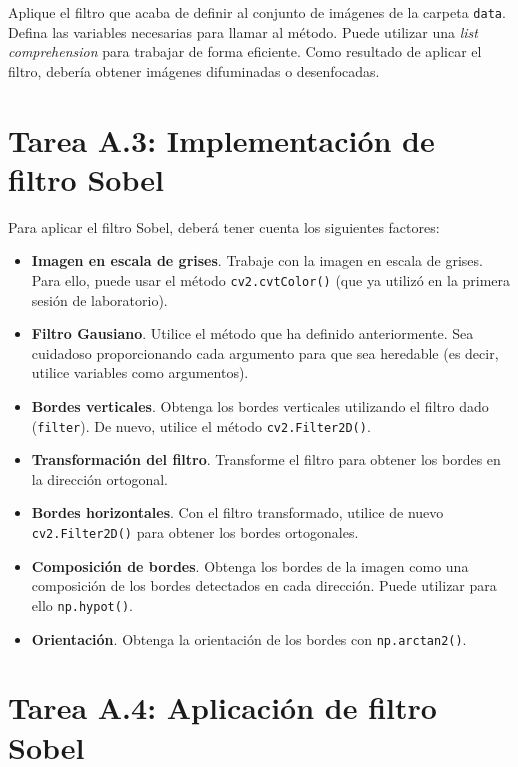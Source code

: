 Aplique el filtro que acaba de definir al conjunto de imágenes de la carpeta \texttt{data}. Defina las variables necesarias para llamar al método. Puede utilizar una \textit{list comprehension} para trabajar de forma eficiente. Como resultado de aplicar el filtro, debería obtener imágenes difuminadas o desenfocadas.

\section*{Tarea A.3: Implementación de filtro Sobel}
{}

Para aplicar el filtro Sobel, deberá tener cuenta los siguientes factores:

\begin{itemize}
    \item \textbf{Imagen en escala de grises}. Trabaje con la imagen en escala de grises. Para ello, puede usar el método \texttt{cv2.cvtColor()} (que ya utilizó en la primera sesión de laboratorio).
    
    \item \textbf{Filtro Gausiano}. Utilice el método que ha definido anteriormente. Sea cuidadoso proporcionando cada argumento para que sea heredable (es decir, utilice variables como argumentos).
    
    \item \textbf{Bordes verticales}. Obtenga los bordes verticales utilizando el filtro dado (\texttt{filter}). De nuevo, utilice el método \texttt{cv2.Filter2D()}.
    \item \textbf{Transformación del filtro}. Transforme el filtro para obtener los bordes en la dirección ortogonal.
    \item \textbf{Bordes horizontales}. Con el filtro transformado, utilice de nuevo \texttt{cv2.Filter2D()} para obtener los bordes ortogonales.
    \item \textbf{Composición de bordes}. Obtenga los bordes de la imagen como una composición de los bordes detectados en cada dirección. Puede utilizar para ello \texttt{np.hypot()}.
    \item \textbf{Orientación}. Obtenga la orientación de los bordes con \texttt{np.arctan2()}.
\end{itemize}

\section*{Tarea A.4: Aplicación de filtro Sobel}
{}

